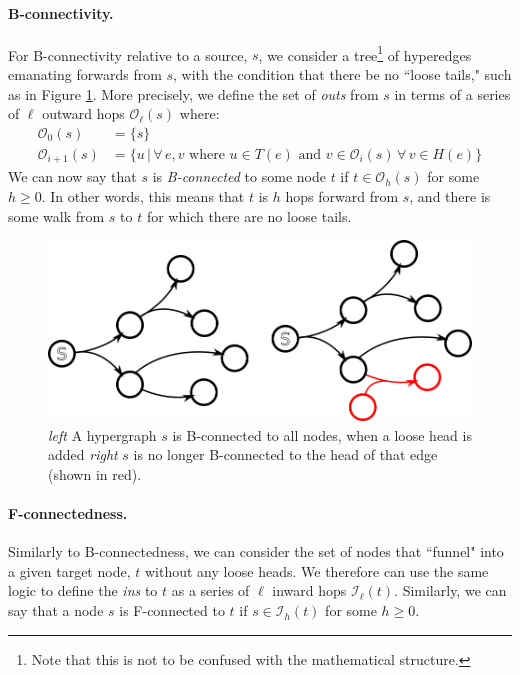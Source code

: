 \documentclass[12pt,twoside]{reedthesis}
\theoremstyle{definition}
\begin{document}
\paragraph{B-connectivity.}For B-connectivity relative to a source, $s$, we consider a tree\footnote{Note that this is not to be confused with the mathematical structure.} of hyperedges emanating forwards from $s$, with the condition that there be no ``loose tails," such as in Figure \ref{fig:B-Hypergraph}. More precisely, we define the set of \textit{outs} from $s$ in terms of a series of $\ell$ outward hops $\mathcal{O}_\ell(s)$ where:
\begin{align*}
  \mathcal{O}_0(s)&=\{s\}\\
  \mathcal{O}_{i+1}(s)&=\{u\,|\,\forall\,e,v \text{ where } u \in T(e) \text{ and } v \in \mathcal{O}_i(s)\,\forall\,v \in H(e)\}
\end{align*}
We can now say that $s$ is \textit{B-connected} to some node $t$ if $t \in \mathcal{O}_h(s)$ for some $h \geq 0$. In other words, this means that $t$ is $h$ hops forward from $s$, and there is some walk from $s$ to $t$ for which there are no loose tails.\par

\begin{figure}[h]
  \begin{center}
    \includegraphics[width=\textwidth]{B-hypergraph}
  \caption[B-connectivity.]{\textit{left }A hypergraph $s$ is B-connected to all nodes, when a loose head is added \textit{right} $s$ is no longer B-connected to the head of that edge (shown in red).}
  \label{fig:B-Hypergraph}
  \end{center}
\end{figure}

\paragraph{F-connectedness.}Similarly to B-connectedness, we can consider the set of nodes that ``funnel" into a given target node, $t$ without any loose heads. We therefore can use the same logic to define the \textit{ins} to $t$ as a series of $\ell$ inward hops $\mathcal{I}_\ell(t)$. Similarly, we can say that a node $s$ is F-connected to $t$ if $s \in \mathcal{I}_h(t)$ for some $h \geq 0$.
\end{document}

